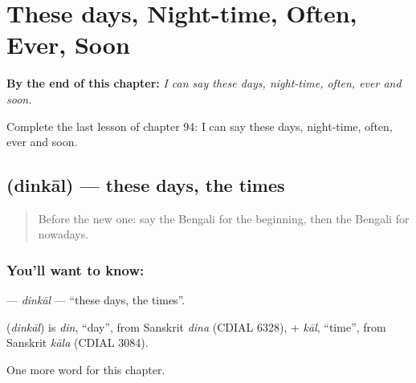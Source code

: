 
\chapter{These days, Night-time, Often, Ever, Soon}
\label{ch:bn-these-days-night-time-often-ever-soon}

\begin{chapteropening}
\textbf{By the end of this chapter:} \emph{I can say these days, night-time, often, ever and soon.}

Complete the last lesson of chapter 94: I can say these days, night-time, often, ever and soon.
\end{chapteropening}

\section[\texorpdfstring{\bn{দিনকাল} (dinkāl)}{দিনকাল (dinkāl)}]{ (dinkāl) — these days, the times}

\label{lesson:BN-C94-dinkal}



\begin{quote}
Before the new one: say the Bengali for the beginning, then the Bengali for nowadays.
\end{quote}

\subsection*{You'll want to know: }
\textbf{} — \emph{dinkāl} — \textquotedblleft{}these days, the times\textquotedblright{}.

\begin{cousinweb}
\textbf{} (\emph{dinkāl}) is \emph{din}, \textquotedblleft{}day\textquotedblright{}, from Sanskrit \emph{dina} (CDIAL 6328), + \emph{kāl}, \textquotedblleft{}time\textquotedblright{}, from Sanskrit \emph{kāla} (CDIAL 3084).
\end{cousinweb}

\begin{grammarlens}[title={What you've built}]
One more word for this chapter.
\end{grammarlens}

